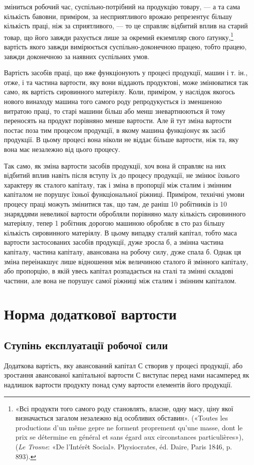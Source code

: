 \parcont{}  %
зміниться робочий час, суспільно-потрібний на продукцію товару, — а та сама кількість бавовни,
приміром, за несприятливого врожаю репрезентує більшу кількість праці, ніж за сприятливого,
— то це справляє відбитий вплив на старий товар, що його завжди рахується лише за окремий екземпляр
свого ґатунку,\footnote{«Всі продукти того самого роду становлять, власне, одну масу, ціну якої визначається загалом
незалежно від особливих обставин». («Toutes les productions d’un même gepre ne forment proprement
qu’une masse, dont le prix se détermine en général et sans égard aux circonstances particulières»),
(\emph{Le Trosne}: «De l’Intérêt Social». Physiocrates, éd. Daire,
Paris 1846, p. 893).
}
вартість якого завжди вимірюється суспільно-доконечною працею, тобто працею, завжди доконечною за
наявних суспільних умов.

Вартість засобів праці, що вже функціонують у процесі продукції,
машин і т. ін., отже, і та частина вартости, яку вони віддають продуктові, може змінюватися так
само, як вартість сировинного матеріялу. Коли, приміром, у наслідок якогось нового винаходу машина
того самого роду репродукується із зменшеною витратою праці, то старі машини більш або менш
зневартнюються
й тому переносять на продукт порівняно менше вартости. Але й тут зміна вартости постає поза тим
процесом продукції,
в якому машина функціонує як засіб продукції. В цьому процесі вона ніколи не віддає більше вартости,
ніж та, яку вона має незалежно від цього процесу.

Так само, як зміна вартости засобів продукції, хоч вона й справляє на них відбитий вплив навіть
після вступу їх до процесу продукції, не змінює їхнього характеру як сталого капіталу, так і зміна в
пропорції між сталим і змінним капіталом не порушує їхньої функціональної ріжниці. Приміром,
технічні умови процесу праці можуть змінитися так, що там, де раніш 10 робітників із 10 знаряддями
невеликої вартости обробляли порівняно малу кількість сировинного матеріялу, тепер 1 робітник
дорогою машиною обробляє в сто раз більшу кількість сировинного матеріялу. В цьому випадку сталий
капітал, тобто маса вартости застосованих
засобів продукції, дуже зросла б, а змінна частина капіталу, частина капіталу, авансована на робочу
силу, дуже спала б. Однак ця зміна переінакшує лише відношення між величиною сталого й змінного капіталу, або пропорцію,
в якій увесь капітал розпадається на сталі та змінні складові частини, але вона не
порушує самої ріжниці між сталим і змінним капіталом.

\section{Норма додаткової вартости}
\subsection{Ступінь експлуатації робочої сили}
Додаткова вартість, яку авансований капітал С створив у процесі продукції, або зростання авансованої
капітальної вартости С виступає перед нами насамперед як надлишок вартости
продукту понад суму вартости елементів його продукції.
